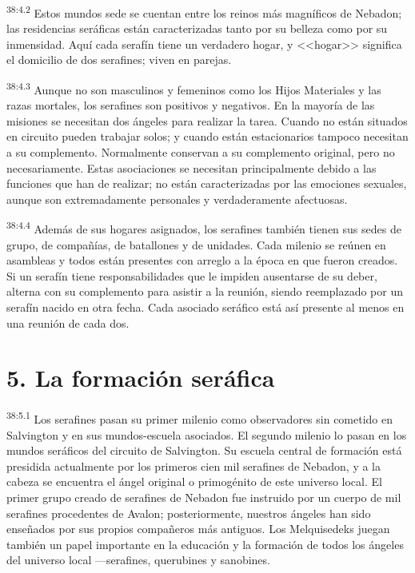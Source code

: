 \par
\textsuperscript{38:4.2} Estos mundos sede se cuentan entre los reinos más magníficos de Nebadon; las residencias seráficas están caracterizadas tanto por su belleza como por su inmensidad. Aquí cada serafín tiene un verdadero hogar, y <<hogar>> significa el domicilio de dos serafines; viven en parejas.

\par
\textsuperscript{38:4.3} Aunque no son masculinos y femeninos como los Hijos Materiales y las razas mortales, los serafines son positivos y negativos. En la mayoría de las misiones se necesitan dos ángeles para realizar la tarea. Cuando no están situados en circuito pueden trabajar solos; y cuando están estacionarios tampoco necesitan a su complemento. Normalmente conservan a su complemento original, pero no necesariamente. Estas asociaciones se necesitan principalmente debido a las funciones que han de realizar; no están caracterizadas por las emociones sexuales, aunque son extremadamente personales y verdaderamente afectuosas.

\par
\textsuperscript{38:4.4} Además de sus hogares asignados, los serafines también tienen sus sedes de grupo, de compañías, de batallones y de unidades. Cada milenio se reúnen en asambleas y todos están presentes con arreglo a la época en que fueron creados. Si un serafín tiene responsabilidades que le impiden ausentarse de su deber, alterna con su complemento para asistir a la reunión, siendo reemplazado por un serafín nacido en otra fecha. Cada asociado seráfico está así presente al menos en una reunión de cada dos.

\section*{5. La formación seráfica}
\par
\textsuperscript{38:5.1} Los serafines pasan su primer milenio como observadores sin cometido en Salvington y en sus mundos-escuela asociados. El segundo milenio lo pasan en los mundos seráficos del circuito de Salvington. Su escuela central de formación está presidida actualmente por los primeros cien mil serafines de Nebadon, y a la cabeza se encuentra el ángel original o primogénito de este universo local. El primer grupo creado de serafines de Nebadon fue instruido por un cuerpo de mil serafines procedentes de Avalon; posteriormente, nuestros ángeles han sido enseñados por sus propios compañeros más antiguos. Los Melquisedeks juegan también un papel importante en la educación y la formación de todos los ángeles del universo local ---serafines, querubines y sanobines.

